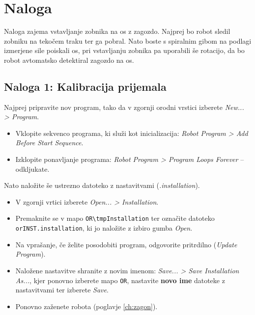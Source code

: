 \section{Naloga}




Naloga zajema vstavljanje zobnika na os z zagozdo. Najprej bo robot sledil zobniku na tekočem traku ter ga pobral. Nato boste s spiralnim gibom na podlagi izmerjene sile poiskali os, pri vstavljanju zobnika pa uporabili še rotacijo, da bo robot avtomatsko detektiral zagozdo na os.

\subsection{Naloga 1: Kalibracija prijemala}


Najprej pripravite nov program, tako da v zgornji orodni vrstici izberete \emph{New... >  Program}.
\begin{itemize}
  \item Vklopite sekvenco programa, ki služi kot inicializacija: \emph{Robot Program > Add Before Start Sequence}.
  \item Izklopite ponavljanje programa: \emph{Robot Program > Program Loops Forever} -- odkljukate.
\end{itemize}
Nato naložite še ustrezno datoteko z nastavitvami (\emph{.installation}).
\begin{itemize}
    \item V zgornji vrtici izberete \emph{Open... > Installation}.
    \item Premaknite se v mapo \verb"OR\tmpInstallation" ter označite datoteko \verb"orINST.installation", ki jo naložite z izbiro gumba \emph{Open}.
    \item Na vprašanje, če želite posodobiti program, odgovorite pritrdilno (\emph{Update Program}).
    \item Naložene nastavitve shranite z novim imenom: \emph{Save... > Save Installation As...}, kjer ponovno izberete mapo \verb"OR", nastavite \textbf{novo ime} datoteke z nastavitvami ter izberete \emph{Save}.
    \item Ponovno zaženete robota (poglavje \ref{ch:zagon}).
\end{itemize}

